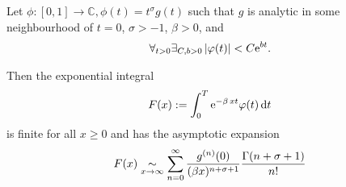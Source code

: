Let $\phi\colon [0,1] \to \mathbb{C}, \phi(t) = t^\sigma g(t)$ such that $g$ is
analytic in some neighbourhood of $t=0$, $\sigma > -1$, $\beta > 0$, and
\begin{align*}
    \forall_{t > 0}\exists_{C, b > 0} \left|\phi(t)\right| < C \Eto{bt}.
\end{align*}

Then the exponential integral
\begin{align*}
    F(x) := \Integ[T]{0}{t}{\Eto{-\beta\,xt}\phi(t)}
\end{align*}
is finite for all $x \geq 0$ and has the asymptotic expansion
\begin{align*}
    F(x)\SimAs{x\to\infty}\sum_{n=0}^{\infty}
    \frac{g^{(n)}(0)}{(\beta x)^{n+\sigma+1}} \frac{\Gamma(n+\sigma+1)}{n!}
\end{align*}
